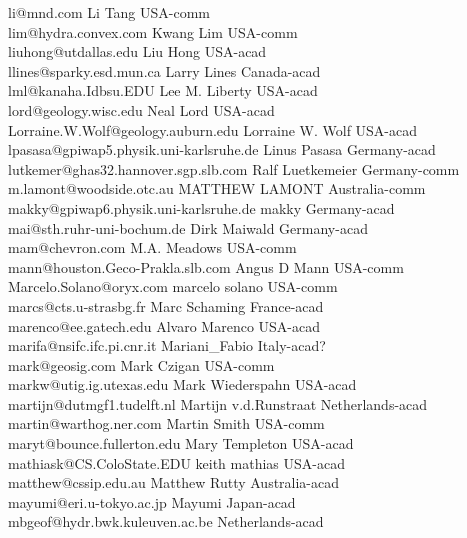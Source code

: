 \begin{tabbing}
li@mnd.com \>  Li Tang  \>   USA-comm\\
lim@hydra.convex.com \> Kwang Lim \> USA-comm\\
liuhong@utdallas.edu \> Liu Hong \> USA-acad\\
llines@sparky.esd.mun.ca \> Larry Lines \> Canada-acad\\
lml@kanaha.Idbsu.EDU \> Lee M. Liberty \>  USA-acad\\
lord@geology.wisc.edu \> Neal Lord \> USA-acad\\
Lorraine.W.Wolf@geology.auburn.edu \> Lorraine W. Wolf \> USA-acad\\
lpasasa@gpiwap5.physik.uni-karlsruhe.de \> Linus Pasasa \> Germany-acad\\
lutkemer@ghas32.hannover.sgp.slb.com \> Ralf Luetkemeier \> Germany-comm\\
m.lamont@woodside.otc.au \> MATTHEW LAMONT \> Australia-comm\\
makky@gpiwap6.physik.uni-karlsruhe.de \>  makky \> Germany-acad\\
mai@sth.ruhr-uni-bochum.de \> Dirk Maiwald \> Germany-acad\\
mam@chevron.com \> M.A. Meadows \> USA-comm\\
mann@houston.Geco-Prakla.slb.com \> Angus D Mann \> USA-comm\\
Marcelo.Solano@oryx.com \> marcelo solano \> USA-comm\\
marcs@cts.u-strasbg.fr \> Marc Schaming \>  France-acad\\
marenco@ee.gatech.edu \> Alvaro Marenco \> USA-acad\\
marifa@nsifc.ifc.pi.cnr.it \> Mariani\_Fabio \> Italy-acad?\\
mark@geosig.com \> Mark Czigan \> USA-comm\\
markw@utig.ig.utexas.edu \> Mark Wiederspahn \> USA-acad\\
martijn@dutmgf1.tudelft.nl \> Martijn v.d.Runstraat \> Netherlands-acad\\
martin@warthog.ner.com \> Martin Smith \>  USA-comm\\
maryt@bounce.fullerton.edu \> Mary Templeton \> USA-acad\\
mathiask@CS.ColoState.EDU \> keith mathias \> USA-acad\\
matthew@cssip.edu.au \> Matthew Rutty \> Australia-acad\\
mayumi@eri.u-tokyo.ac.jp \> Mayumi \> Japan-acad\\
mbgeof@hydr.bwk.kuleuven.ac.be  \> \> Netherlands-acad\\

\end{tabbing}
